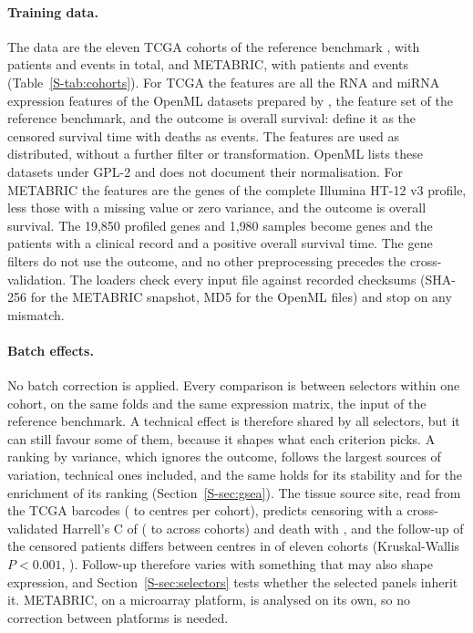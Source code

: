 \paragraph{Training data.} The data are the eleven TCGA cohorts of the reference
benchmark \citep{bommert2021bib}, with \SuppTcgaPatients{} patients and
\SuppTcgaEvents{} events in total, and METABRIC, with \SuppMetabricN{} patients and
\SuppMetabricEvents{} events (Table~\ref{S-tab:cohorts}). For TCGA the features are all
the RNA and miRNA expression features of the OpenML datasets prepared by
\citet{herrmann2020}, the feature set of the reference benchmark, and the outcome is
overall survival: \citet{herrmann2020} define it as the censored survival time with
deaths as events. The features are used as distributed, without a further filter or
transformation. OpenML lists these datasets under GPL-2 and does not document their
normalisation. For METABRIC the features are the genes of the complete Illumina HT-12 v3
profile, less those with a missing value or zero variance, and the outcome is overall
survival. The 19{,}850 profiled genes and 1{,}980 samples become \SuppMetabricP{} genes
and the \SuppMetabricN{} patients with a clinical record and a positive overall survival
time. The gene filters do not use the outcome, and no other preprocessing precedes the
cross-validation. The loaders check every input file against recorded checksums (SHA-256
for the METABRIC snapshot, MD5 for the OpenML files) and stop on any mismatch.

\paragraph{Batch effects.} No batch correction is applied. Every comparison is between
selectors within one cohort, on the same folds and the same expression matrix, the input
of the reference benchmark. A technical effect is therefore shared by all selectors, but it
can still favour some of them, because it shapes what each criterion picks. A ranking by
variance, which ignores the outcome, follows the largest sources of variation, technical
ones included, and the same holds for its stability and for the enrichment of its ranking
(Section~\ref{S-sec:gsea}). The tissue source site, read from the TCGA barcodes
(\SuppCentreMin{} to \SuppCentreMax{} centres per cohort), predicts censoring with a
cross-validated Harrell's C of \SuppCentreCens{} (\SuppCentreCensMin{} to
\SuppCentreCensMax{} across cohorts) and death with \SuppCentreDeath, and the follow-up of
the censored patients differs between centres in \SuppCentreDiffer{} of eleven cohorts
(Kruskal-Wallis $P < 0.001$, ). Follow-up therefore varies with
something that may also shape expression, and Section~\ref{S-sec:selectors} tests whether
the selected panels inherit it. METABRIC, on a microarray platform, is analysed on its
own, so no correction between platforms is needed.

